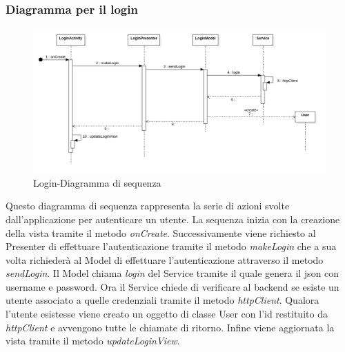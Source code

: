 \subsubsection{Diagramma per il login}
\begin{figure}[H]
	\centering
	\includegraphics[width=16cm]{res/images/loginSeq.png}
	\caption{Login-Diagramma di sequenza}
	\label{fig:Login-Diagramma di sequenza}
\end{figure}
Questo diagramma di sequenza rappresenta la serie di azioni svolte dall'applicazione per autenticare un utente.
La sequenza inizia con la creazione della vista tramite il metodo \textit{onCreate}. Successivamente viene richiesto al Presenter di effettuare l'autenticazione tramite il metodo \textit{makeLogin} che a sua volta richiederà al Model di effettuare l'autenticazione attraverso il metodo \textit{sendLogin}.
Il Model chiama \textit{login} del Service tramite il quale genera il json con username e password. Ora il Service chiede di verificare al backend se esiste un utente associato a quelle credenziali tramite il metodo \textit{httpClient}.
Qualora l'utente esistesse viene creato un oggetto di classe User con l'id restituito da \textit{httpClient} e avvengono tutte le chiamate di ritorno.
Infine viene aggiornata la vista tramite il metodo \textit{updateLoginView}. 

